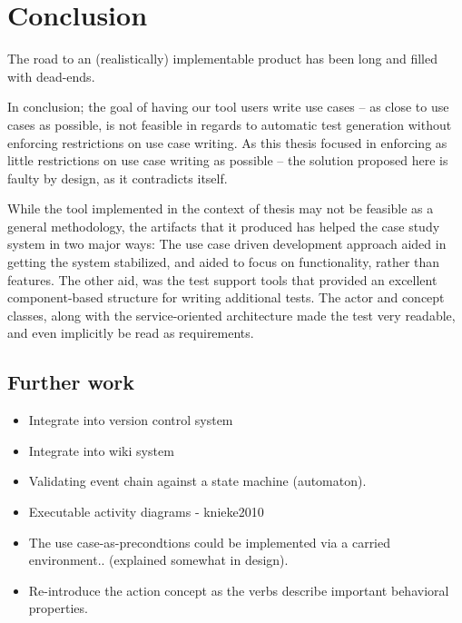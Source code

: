 \chapter{Conclusion}
The road to an (realistically) implementable product has been long and filled with dead-ends.\medskip

\noindent In conclusion; the goal of having our tool users write use cases -- as close to use cases as possible, is not feasible in regards to automatic test generation without enforcing restrictions on use case writing. As this thesis focused in enforcing as little restrictions on use case writing as possible -- the solution proposed here is faulty by design, as it contradicts itself.\medskip

\noindent While the tool implemented in the context of thesis may not be feasible as a general methodology, the artifacts that it produced has helped the case study system in two major ways: The use case driven development approach aided in getting the system stabilized, and aided to focus on functionality, rather than features. The other aid, was the test support tools that provided an excellent component-based structure for writing additional tests. The actor and concept classes, along with the service-oriented architecture made the test very readable, and even implicitly be read as requirements.
\section{Further work}
\begin{itemize}
  \item Integrate into version control system
  \item Integrate into wiki system
  \item Validating event chain against a state machine (automaton).
  \item Executable activity diagrams - knieke2010 
  \item The use case-as-precondtions could be implemented via a carried environment.. (explained somewhat in design).
  \item Re-introduce the action concept as the verbs describe important behavioral properties.
\end{itemize}


